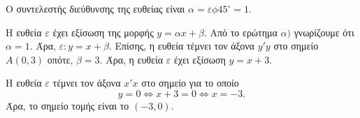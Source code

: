 
\begin{alist}
\item Ο συντελεστής διεύθυνσης της ευθείας είναι $\alpha = \varepsilon\phi 45^\circ = 1$.

\item Η ευθεία $\varepsilon$ έχει εξίσωση της μορφής $y = \alpha x + \beta$. Από το ερώτημα $\alpha)$ γνωρίζουμε ότι
$\alpha = 1$. Άρα, $\varepsilon: y = x + \beta$. Επίσης, η ευθεία τέμνει τον άξονα $y'y$ στο σημείο $A(0, 3)$ οπότε,
$\beta = 3$. Άρα, η ευθεία $\varepsilon$ έχει εξίσωση $y = x + 3$.

\item Η ευθεία $\varepsilon$ τέμνει τον άξονα $x'x$ στο σημείο για το οποίο
\[y = 0 \Leftrightarrow x + 3 = 0 \Leftrightarrow x = -3.\]
Άρα, το σημείο τομής είναι το $(-3, 0)$.
\end{alist}

